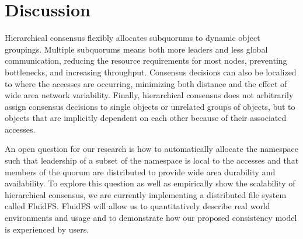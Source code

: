 \documentclass[sigconf]{acmart}
\begin{document}
\section{Discussion}

Hierarchical consensus flexibly allocates subquorums to dynamic object groupings.
Multiple subquorums means both more leaders and less global communication, reducing the
resource requirements for most nodes, preventing bottlenecks, and increasing throughput.
Consensus decisions can also be localized to where the accesses are occurring,
minimizing both distance and the effect of wide area network variability.
Finally, hierarchical consensus does not arbitrarily assign consensus decisions to single
objects or unrelated groups of objects, but to objects that are implicitly dependent on
each other because of their associated accesses.

An open question for our research is how to automatically allocate the namespace such that
leadership of a subset of the namespace is local to the accesses and that members of the
quorum are distributed to provide wide area durability and availability.
To explore this question as well as empirically show the scalability of hierarchical
consensus, we are currently implementing a distributed file system called FluidFS.
FluidFS will allow us to quantitatively describe real world environments and usage and
to demonstrate how our proposed consistency model is experienced by users.



\end{document}
